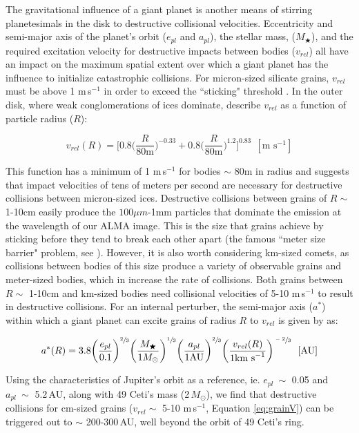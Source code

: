 The gravitational influence of a giant planet is another means of stirring planetesimals in the disk to destructive collisional velocities. Eccentricity and semi-major axis of the planet's orbit ($e_{pl}$ and $a_{pl}$), the stellar mass, ($M_{\bigstar}$), and the required excitation velocity for destructive impacts between bodies ($v_{rel}$) all have an impact on the maximum spatial extent over which a giant planet has the influence to initialize catastrophic collisions. For micron-sized silicate grains, $v_{rel}$ must be above 1 m$\,$s$^{-1}$ in order to exceed the ``sticking" threshold \citep{Gutt10}. In the outer disk, where weak conglomerations of ices dominate, \cite{Must09} describe $v_{rel}$ as a function of particle radius ($R$):

\begin{equation}
\label{eq:grainV}
v_{rel}(R) = \Bigg[0.8\bigg(\frac{R}{80\text{m}}\bigg)^{-0.33} + 0.8\bigg(\frac{R}{80\text{m}}\bigg)^{1.2}\Bigg]^{0.83}~~[\text{m s}^{-1}]
\end{equation}

This function has a minimum of 1 m$\,$s$^{-1}$ for bodies $\sim$ 80m in radius and suggests that impact velocities of tens of meters per second are necessary for destructive collisions between micron-sized ices. Destructive collisions between grains of $R\sim$ 1-10cm easily produce the $100\mu m$-1mm particles that dominate the emission at the wavelength of our ALMA image. This is the size that grains achieve by sticking before they tend to break each other apart (the famous ``meter size barrier" problem, see \citealt{Blum08}). However, it is also worth considering km-sized comets, as collisions between bodies of this size produce a variety of observable grains and meter-sized bodies, which in increase the rate of collisions. Both grains between $R\sim$ 1-10cm and km-sized bodies need collisional velocities of 5-10 m$\,$s$^{-1}$ to result in destructive collisions. For an internal perturber, the semi-major axis ($a^{\ast}$) within which a giant planet can excite grains of radius $R$ to $v_{rel}$ is given by \cite{Must09} as:

\begin{equation}
a^{\ast}(R) = 3.8 \bigg(\frac{e_{pl}}{0.1}\bigg)^{\sfrac{2}{3}} \bigg(\frac{M_{\bigstar}}{1M_{\odot}}\bigg)^{\sfrac{1}{3}} \bigg(\frac{a_{pl}}{1\text{AU}}\bigg)^{\sfrac{2}{3}} \bigg(\frac{v_{rel}(R)}{1\text{km s}^{-1}}\bigg)^{\sfrac{-2}{3}}~~[\text{AU}]
\end{equation}

Using the characteristics of Jupiter's orbit as a reference, ie. $e_{pl}~\sim$ 0.05 and $a_{pl}~\sim$ 5.2\,AU, along with 49 Ceti's mass (2\,$M_{\odot}$), we find that destructive collisions for cm-sized grains ($v_{rel} \sim$ 5-10 m$\,$s$^{-1}$, Equation \ref{eq:grainV}) can be triggered out to $\sim$ 200-300\,AU, well beyond the orbit of 49 Ceti's ring. 

